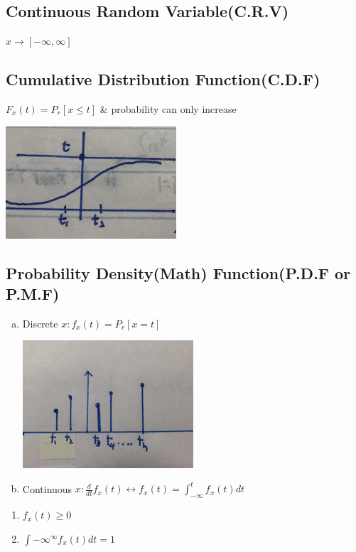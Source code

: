 \documentclass{article}
\begin{document}
\subsection{Continuous Random Variable(C.R.V)}        
	$ x\rightarrow [ -\infty, \infty] $

\subsection{Cumulative Distribution Function(C.D.F)}
	$ F_x(t)= P_r[x\le t]$ \& probability can only increase

\begin{center}{
\includegraphics{cdf.png}
}
\end{center}  	
            
\subsection{Probability Density(Math) Function(P.D.F or P.M.F)}
	\begin{enumerate}[a)]
	\item Discrete $ x: f_x(t)= P_r[x= t]$

\begin{center}{
\includegraphics{discretepdf.png}
}
\end{center}
 
	  
	\item Continuous $ x: \frac{d}{dt}f_x(t)\leftrightarrow f_x(t)=\int_{-\infty}^{t}f_x(t)dt$
	\end{enumerate}
		\begin{enumerate}[i]
		\item $f_x(t)\ge 0$
		\item $\int{-\infty}^{\infty}f_x(t)dt= 1$
		\end{enumerate}
		
\end{document}

